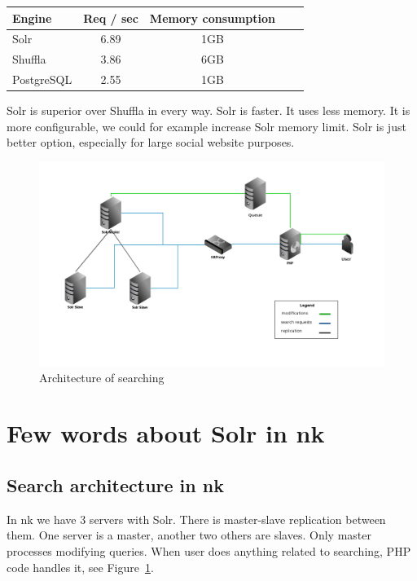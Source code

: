 \documentclass[10pt,a4paper]{article}
\begin{document}
\begin{center}
\begin{tabular}{|l|c|c|c|c|}
\hline Engine & Req / sec & Memory consumption \\
\hline Solr & 6.89 & 1GB \\
\hline Shuffla & 3.86 & 6GB  \\
\hline PostgreSQL & 2.55 & 1GB \\
\hline 
\end{tabular}
\end{center}

Solr is superior over Shuffla in every way. Solr is faster. It uses less memory. It is more configurable, we could for example increase Solr memory limit. Solr is just better option, especially for large social website purposes. 

\begin{figure}[b!]
\centering
  \includegraphics[width=12cm]{architektura_wyszukiwania}
  \caption{Architecture of searching}
  \label{fig:arch}
\end{figure}

\section{Few words about Solr in nk}
\label{chapter:nk}

\subsection{Search architecture in nk}

In nk we have 3 servers with Solr. There is master-slave replication between them. One server is a master, another two others are slaves. Only master processes modifying queries. When user does anything related to searching, PHP code handles it, see Figure~\ref{fig:arch}.
\end{document}
